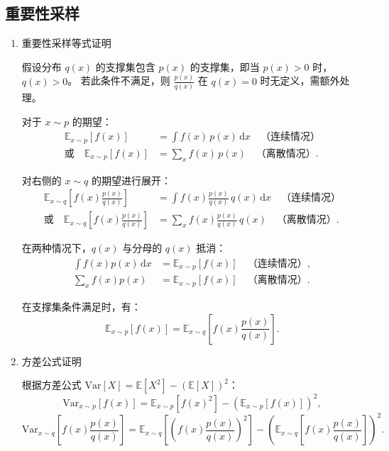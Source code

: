 \documentclass{article}
\begin{document}
\subsection{重要性采样}
\begin{enumerate}[label=(\alph*), start=1]
    
    \item 重要性采样等式证明
    
    假设分布 \(q(x)\) 的支撑集包含 \(p(x)\) 的支撑集，即当 \(p(x) > 0\) 时，\(q(x) > 0\)。  
    若此条件不满足，则 \(\frac{p(x)}{q(x)}\) 在 \(q(x) = 0\) 时无定义，需额外处理。
    
    对于 \(x \sim p\) 的期望：  
    \begin{align}
    	\mathbb{E}_{x \sim p}[f(x)] 
    	&= \int f(x) \, p(x) \, \mathrm{d}x \quad \text{（连续情况）} \\
    	\text{或} \quad \mathbb{E}_{x \sim p}[f(x)] 
    	&= \sum_{x} f(x) \, p(x) \quad \text{（离散情况）}.
    \end{align}
    
    对右侧的 \(x \sim q\) 的期望进行展开：  
    \begin{align}
    	\mathbb{E}_{x \sim q}\left[f(x) \frac{p(x)}{q(x)}\right] 
    	&= \int f(x) \frac{p(x)}{q(x)} \, q(x) \, \mathrm{d}x \quad \text{（连续情况）} \\
    	\text{或} \quad \mathbb{E}_{x \sim q}\left[f(x) \frac{p(x)}{q(x)}\right] 
    	&= \sum_{x} f(x) \frac{p(x)}{q(x)} \, q(x) \quad \text{（离散情况）}.
    \end{align}
    
    在两种情况下，\(q(x)\) 与分母的 \(q(x)\) 抵消：  
    \begin{align}
    	\int f(x) p(x) \, \mathrm{d}x 
    	&= \mathbb{E}_{x \sim p}[f(x)] \quad \text{（连续情况）}, \\
    	\sum_{x} f(x) p(x) 
    	&= \mathbb{E}_{x \sim p}[f(x)] \quad \text{（离散情况）}.
    \end{align}
    
    在支撑集条件满足时，有：  
    \[
    \mathbb{E}_{x \sim p}[f(x)] = \mathbb{E}_{x \sim q}\left[f(x) \frac{p(x)}{q(x)}\right].
    \]
    
    \item 方差公式证明
    
    根据方差公式 \(\text{Var}[X] = \mathbb{E}[X^2] - (\mathbb{E}[X])^2\)：
    \[
    \text{Var}_{x \sim p}[f(x)] = \mathbb{E}_{x \sim p}\left[f(x)^2\right] - \left(\mathbb{E}_{x \sim p}[f(x)]\right)^2,
    \]
    \[
    \text{Var}_{x \sim q}\left[f(x)\frac{p(x)}{q(x)}\right] = \mathbb{E}_{x \sim q}\left[\left(f(x)\frac{p(x)}{q(x)}\right)^2\right] - \left(\mathbb{E}_{x \sim q}\left[f(x)\frac{p(x)}{q(x)}\right]\right)^2.
    \]
    

\end{enumerate}
\end{document}
